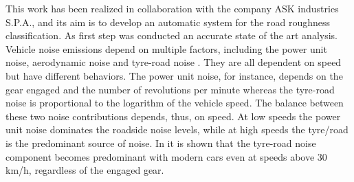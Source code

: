 This work has been realized in collaboration with the company ASK industries S.P.A., and its aim is to develop an automatic system for the road roughness classification. As first step was conducted an accurate state of the art analysis.	
Vehicle noise emissions depend on multiple factors, including the power unit noise, aerodynamic noise and tyre-road noise \cite{hanson2004tire}. They are all dependent on speed but have different behaviors. The power unit noise, for instance, depends on the gear engaged and the number of revolutions per minute whereas the tyre-road noise is proportional to the logarithm of the vehicle speed. The balance between these two noise contributions depends, thus, on speed. 
At low speeds the power unit noise dominates the roadside noise levels, while at high speeds the tyre/road is the predominant source of noise. In \cite{sandberg2001tyre} it is shown that  the tyre-road noise component becomes predominant with modern cars even at speeds above 30 km/h, regardless of the engaged gear. 

